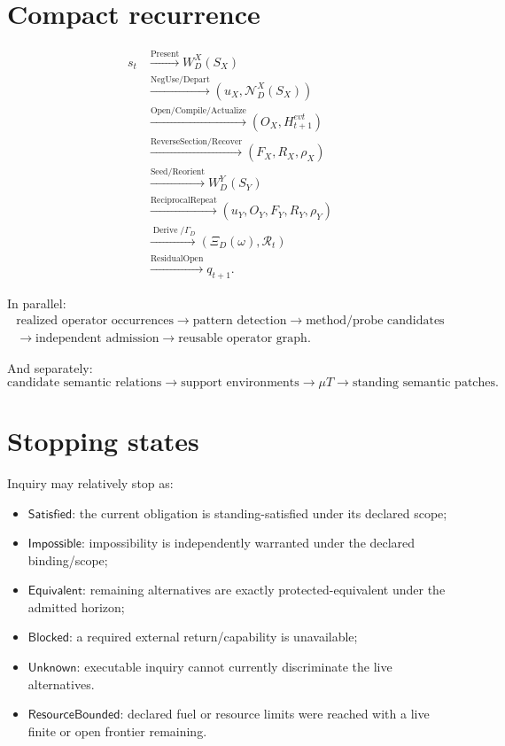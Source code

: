 \documentclass[11pt,oneside]{article}
\begin{document}
\section{Compact recurrence}

\[
\boxed{
\begin{aligned}
s_t
&\xrightarrow{\operatorname{Present}}
W_D^X(S_X)\\
&\xrightarrow{\operatorname{NegUse/Depart}}
(u_X,\mathcal N_D^X(S_X))\\
&\xrightarrow{\operatorname{Open/Compile/Actualize}}
(O_X,H_{t+1}^{evt})\\
&\xrightarrow{\operatorname{ReverseSection/Recover}}
(F_X,R_X,\rho_X)\\
&\xrightarrow{\operatorname{Seed/Reorient}}
W_D^Y(S_Y)\\
&\xrightarrow{\operatorname{ReciprocalRepeat}}
(u_Y,O_Y,F_Y,R_Y,\rho_Y)\\
&\xrightarrow{\operatorname{Derive}/\Gamma_D}
(\Xi_D(\omega),\mathcal R_t)\\
&\xrightarrow{\operatorname{ResidualOpen}}
q_{t+1}.
\end{aligned}
}
\]

In parallel:
\[
\boxed{
\begin{gathered}
\text{realized operator occurrences}\to\text{pattern detection}\to\text{method/probe candidates}\\
\to\text{independent admission}\to\text{reusable operator graph}.
\end{gathered}
}
\]

And separately:
\[
\boxed{
\text{candidate semantic relations}\to\text{support environments}\to\mu T
\to\text{standing semantic patches}.
}
\]

\section{Stopping states}

Inquiry may relatively stop as:
\begin{itemize}
\item \(\mathsf{Satisfied}\): the current obligation is standing-satisfied under its declared scope;
\item \(\mathsf{Impossible}\): impossibility is independently warranted under the declared binding/scope;
\item \(\mathsf{Equivalent}\): remaining alternatives are exactly protected-equivalent under the admitted horizon;
\item \(\mathsf{Blocked}\): a required external return/capability is unavailable;
\item \(\mathsf{Unknown}\): executable inquiry cannot currently discriminate the live alternatives.
\item \(\mathsf{ResourceBounded}\): declared fuel or resource limits were reached with a live finite or open frontier remaining.
\end{itemize}
\end{document}
